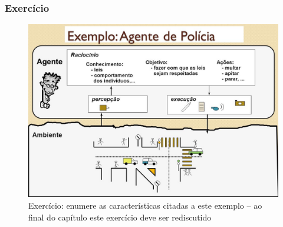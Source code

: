 \begin{frame} %

 \frametitle{Exercício}
    
\begin{figure}[!ht]
\centering
\includegraphics[height =.6\textheight,width=.8\textwidth]{figuras/agente_policial.jpg}
\caption{Exercício: enumere as características citadas a este exemplo -- ao final do capítulo este exercício deve ser rediscutido}
\label{agente_policial}
\end{figure}

\end{frame}



